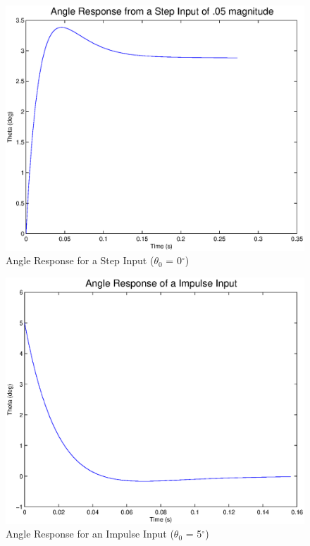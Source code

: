 \documentclass{article}
\begin{document}
\begin{figure}[!htb]
    \centering
    \includegraphics[scale=0.6]{2}
    \caption{Angle Response for a Step Input ($\theta_0$ = 0$^{\circ}$)}
\end{figure} 

\begin{figure}[!htb]
    \centering
    \includegraphics[scale=0.6]{3}
    \caption{Angle Response for an Impulse Input ($\theta_0$ = 5$^{\circ}$)}
\end{figure} 
\end{document}
